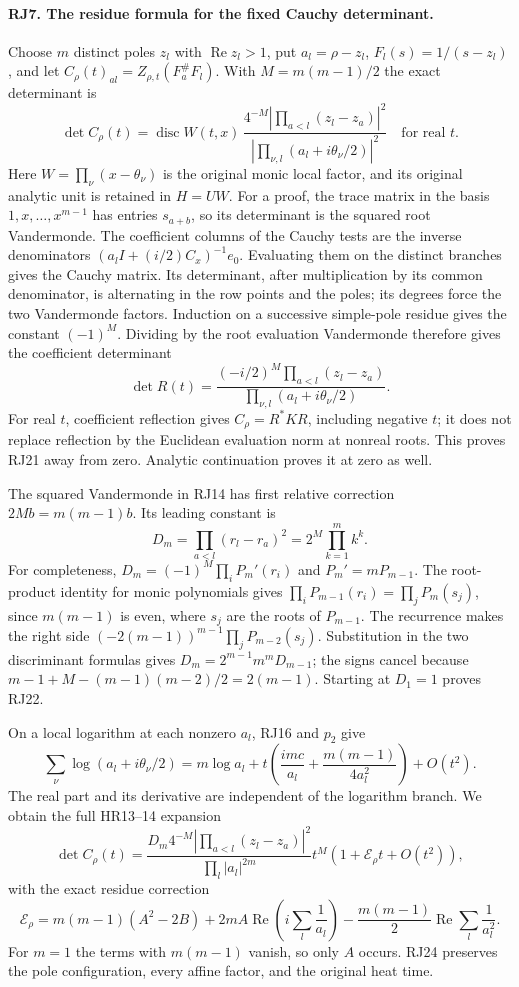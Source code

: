\documentclass[11pt,a4paper]{article}
\theoremstyle{definition}\newtheorem{definition}[theorem]{Definition}
\begin{document}
\paragraph{RJ7. The residue formula for the fixed Cauchy determinant.}
Choose $m$ distinct poles $z_l$ with $\operatorname{Re}z_l>1$,
put $a_l=\rho-z_l$, $F_l(s)=1/(s-z_l)$, and let
$C_\rho(t)_{al}=Z_{\rho,t}(F_a^\#F_l)$.
With $M=m(m-1)/2$ the exact determinant is
\[
 \det C_\rho(t)=\operatorname{disc}W(t,x)\,
 \frac{4^{-M}|\prod_{a<l}(z_l-z_a)|^2}
      {|\prod_{\nu,l}(a_l+i\theta_\nu/2)|^2}
 \quad\text{for real }t.
 \tag{RJ21}
\]
Here $W=\prod_\nu(x-\theta_\nu)$ is the original monic local
factor, and its original analytic unit is retained in $H=UW$.
For a proof, the trace matrix in the basis $1,x,\ldots,x^{m-1}$
has entries $s_{a+b}$, so its determinant is the squared root
Vandermonde. The coefficient columns of the Cauchy tests are the
inverse denominators $(a_l I+(i/2)C_x)^{-1}e_0$. Evaluating them
on the distinct branches gives the Cauchy matrix. Its determinant,
after multiplication by its common denominator, is alternating in
the row points and the poles; its degrees force the two Vandermonde
factors. Induction on a successive simple-pole residue gives the
constant $(-1)^M$. Dividing by the root evaluation Vandermonde
therefore gives the coefficient determinant
\[
 \det R(t)=\frac{(-i/2)^M\prod_{a<l}(z_l-z_a)}
                     {\prod_{\nu,l}(a_l+i\theta_\nu/2)}.
\]
For real $t$, coefficient reflection gives $C_\rho=R^*KR$,
including negative $t$; it does not replace reflection by the
Euclidean evaluation norm at nonreal roots. This proves RJ21
away from zero. Analytic continuation proves it at zero as well.

The squared Vandermonde in RJ14 has first relative correction
$2Mb=m(m-1)b$. Its leading constant is
\[
 D_m=\prod_{a<l}(r_l-r_a)^2=2^M\prod_{k=1}^m k^k.
 \tag{RJ22}
\]
For completeness, $D_m=(-1)^M\prod_iP_m'(r_i)$ and
$P_m'=mP_{m-1}$. The root-product identity for monic polynomials
gives $\prod_iP_{m-1}(r_i)=\prod_jP_m(s_j)$, since $m(m-1)$
is even, where $s_j$ are the roots of $P_{m-1}$.
The recurrence makes the right side
$(-2(m-1))^{m-1}\prod_jP_{m-2}(s_j)$.
Substitution in the two discriminant formulas gives
$D_m=2^{m-1}m^mD_{m-1}$; the signs cancel because
$m-1+M-(m-1)(m-2)/2=2(m-1)$. Starting at $D_1=1$
proves RJ22.

On a local logarithm at each nonzero $a_l$, RJ16 and $p_2$
give
\[
 \sum_\nu\log(a_l+i\theta_\nu/2)
 =m\log a_l+t\left(\frac{imc}{a_l}
                    +\frac{m(m-1)}{4a_l^2}\right)+O(t^2).
\]
The real part and its derivative are independent of the logarithm
branch. We obtain the full HR13--14 expansion
\[
 \det C_\rho(t)=
 \frac{D_m4^{-M}|\prod_{a<l}(z_l-z_a)|^2}
      {\prod_l|a_l|^{2m}}
 t^M\left(1+\mathcal E_\rho t+O(t^2)\right),
 \tag{RJ23}
\]
with the exact residue correction
\[
 \boxed{\mathcal E_\rho=m(m-1)(A^2-2B)
       +2mA\operatorname{Re}\left(i\sum_l\frac1{a_l}\right)
       -\frac{m(m-1)}2\operatorname{Re}\sum_l\frac1{a_l^2}.}
 \tag{RJ24}
\]
For $m=1$ the terms with $m(m-1)$ vanish, so only $A$ occurs.
RJ24 preserves the pole configuration, every affine factor, and
the original heat time.
\end{document}
